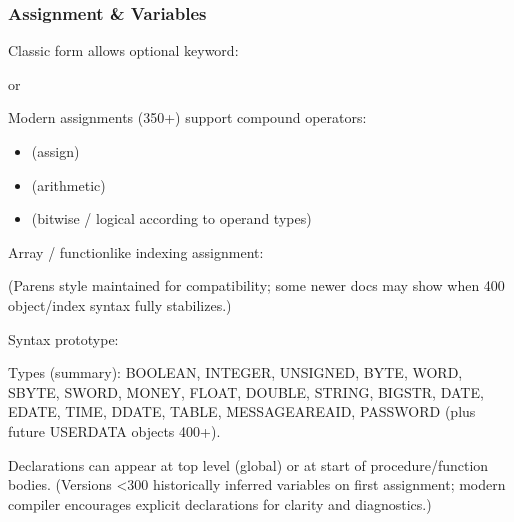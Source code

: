\documentclass[letterpaper,10pt,english]{sphinxmanual}
\begin{document}
\subsubsection{Assignment \& Variables}
\label{\detokenize{ppl:assignment-variables}}\begin{description}
\sphinxAtStartPar
Classic form allows optional  keyword:

\sphinxAtStartPar
{} or 

\sphinxAtStartPar
Modern assignments (350+) support compound operators:
\begin{itemize}
\item {} 
\sphinxAtStartPar
\sphinxcode{\sphinxupquote{=}} (assign)

\item {} 
\sphinxAtStartPar
\sphinxcode{\sphinxupquote{+=}} \sphinxcode{\sphinxupquote{\sphinxhyphen{}=}} \sphinxcode{\sphinxupquote{*=}} \sphinxcode{\sphinxupquote{/=}} \sphinxcode{\sphinxupquote{\%=}} (arithmetic)

\item {} 
\sphinxAtStartPar
\sphinxcode{\sphinxupquote{\&=}} \sphinxcode{\sphinxupquote{|=}} (bitwise / logical according to operand types)

\end{itemize}

\sphinxAtStartPar
Array / function\sphinxhyphen{}like indexing assignment:

\sphinxAtStartPar
{}
(Parens style maintained for compatibility; some newer docs may show  when 400 object/index syntax fully stabilizes.)

\sphinxAtStartPar
Syntax prototype:

\begin{sphinxVerbatim}[commandchars=\\\{\}]
 \PYG{p}{[}  \PYG{p}{]}
 \PYG{p}{[} \PYG{p}{[} \PYG{p}{]}\PYG{p}{]}
\end{sphinxVerbatim}

\sphinxAtStartPar
Types (summary): BOOLEAN, INTEGER, UNSIGNED, BYTE, WORD, SBYTE, SWORD, MONEY, FLOAT, DOUBLE, STRING, BIGSTR, DATE, EDATE, TIME, DDATE, TABLE, MESSAGEAREAID, PASSWORD (plus future USERDATA objects 400+).

\sphinxAtStartPar
Declarations can appear at top level (global) or at start of procedure/function bodies.
(Versions \textless{}300 historically inferred variables on first assignment; modern compiler encourages explicit declarations for clarity and diagnostics.)

\end{description}
\end{document}
